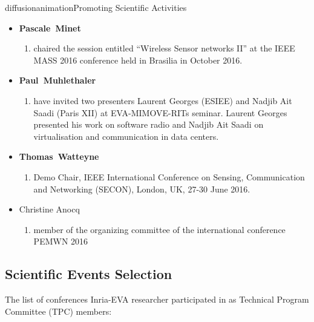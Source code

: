 \documentclass{ra2016}
\newcommand{\paul}             {\textbf{Paul~Muhlethaler}}
\newcommand{\pascale}          {\textbf{Pascale~Minet}}
\newcommand{\thomas}           {\textbf{Thomas~Watteyne}}
\begin{document}
\begin{module}{diffusion}{animation}{Promoting Scientific Activities}
\begin{itemize}
    \item \pascale
        \begin{enumerate}
            \item chaired the session entitled ``Wireless Sensor networks II'' at the IEEE MASS 2016 conference held in Brasilia in October 2016.
        \end{enumerate}
    \item \paul
        \begin{enumerate}
            \item have invited two presenters Laurent Georges (ESIEE)  and Nadjib Ait Saadi (Paris XII) at EVA-MIMOVE-RITs seminar. Laurent Georges presented his work on software radio and  Nadjib Ait Saadi on virtualisation and communication in data centers. 
        \end{enumerate}
    \item \thomas
        \begin{enumerate}
            \item Demo Chair, IEEE International Conference on Sensing, Communication and Networking (SECON), London, UK, 27-30 June 2016.
        \end{enumerate}
    \item Christine Anocq
        \begin{enumerate}
            \item member of the organizing committee of the international conference PEMWN 2016
        \end{enumerate}
\end{itemize}

\subsection {Scientific Events Selection}
 
The list of conferences Inria-EVA researcher participated in as Technical Program Committee (TPC) members:


\end{module}
\end{document}
